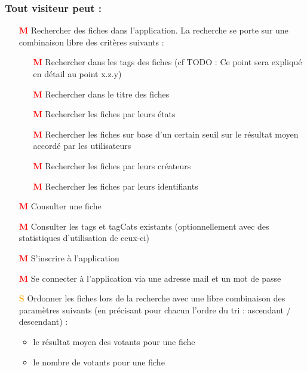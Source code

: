 \subsubsection*{Tout visiteur peut : }

\begin{itemize}
    \item[\textcolor{red}{\textbf{M}}] Rechercher des \glspl{fiche} dans l'application. La recherche se porte sur une combinaison libre des critères suivants : 
    \begin{itemize}
        \item[\textcolor{red}{\textbf{M}}] Rechercher dans les \glspl{tag} des \glspl{fiche} (cf TODO : Ce point sera expliqué en détail au point x.z.y)
        \item[\textcolor{red}{\textbf{M}}] Rechercher dans le titre des \glspl{fiche}
        \item[\textcolor{red}{\textbf{M}}] Rechercher les \glspl{fiche} par leurs états
        \item[\textcolor{red}{\textbf{M}}] Rechercher les \glspl{fiche} sur base d'un certain seuil sur le résultat moyen accordé par les utilisateurs
        \item[\textcolor{red}{\textbf{M}}] Rechercher les \glspl{fiche} par leurs créateurs
        \item[\textcolor{red}{\textbf{M}}] Rechercher les \glspl{fiche} par leurs identifiants
    \end{itemize}
        \item[\textcolor{red}{\textbf{M}}] Consulter une \gls{fiche}
    \item[\textcolor{red}{\textbf{M}}] Consulter les \glspl{tag} et \glspl{tagCat} existants (optionnellement avec des statistiques d'utilisation de ceux-ci)
    \item[\textcolor{red}{\textbf{M}}] S'inscrire à l'application
    \item[\textcolor{red}{\textbf{M}}] Se connecter à l'application via une adresse mail et un mot de passe
    \item[\textcolor{orange}{\textbf{S}}] Ordonner les \glspl{fiche} lors de la recherche avec une libre combinaison des paramètres suivants (en précisant pour chacun l'ordre du tri : ascendant / descendant) :
            \begin{itemize}
            \item le résultat moyen des votants pour une \gls{fiche}
            \item le nombre de votants pour une \gls{fiche}

\end{itemize}
\end{itemize}
